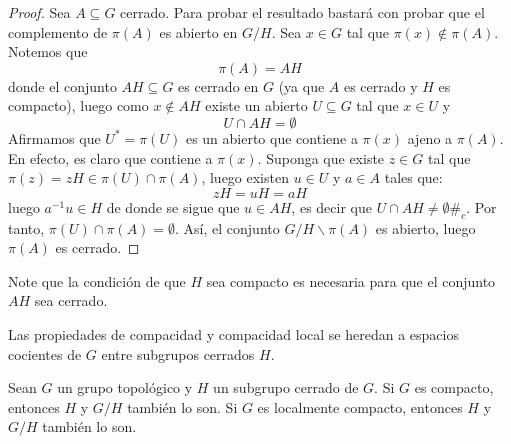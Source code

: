 \documentclass[12pt]{report}
\theoremstyle{largebreak}
\newcommand{\contradiction}{\ensuremath{\#_{c}}}
\begin{document}
    \begin{proof}
        Sea $A\subseteq G$ cerrado. Para probar el resultado bastará con probar que el complemento de $\pi(A)$ es abierto en $G/H$. Sea $x\in G$ tal que $\pi(x)\notin\pi(A)$. Notemos que
        \begin{equation*}
            \pi(A)=AH
        \end{equation*}
        donde el conjunto $AH\subseteq G$ es cerrado en $G$ (ya que $A$ es cerrado y $H$ es compacto), luego como $x\notin AH$ existe un abierto $U\subseteq G$ tal que $x\in U$ y
        \begin{equation*}
            U\cap AH=\emptyset
        \end{equation*}
        Afirmamos que $U^*=\pi(U)$ es un abierto que contiene a $\pi(x)$ ajeno a $\pi(A)$. En efecto, es claro que contiene a $\pi(x)$. Suponga que existe $z\in G$ tal que $\pi(z)=zH\in \pi(U)\cap\pi(A)$, luego existen $u\in U$ y $a\in A$ tales que:
        \begin{equation*}
            zH=uH=aH
        \end{equation*}
        luego $a^{-1}u\in H$ de donde se sigue que $u\in AH$, es decir que $U\cap AH\neq\emptyset$\contradiction. Por tanto, $\pi(U)\cap \pi(A)=\emptyset$. Así, el conjunto $G/H\backslash\pi(A)$ es abierto, luego $\pi(A)$ es cerrado.
    \end{proof}

    \begin{obs}
        Note que la condición de que $H$ sea compacto es necesaria para que el conjunto $AH$ sea cerrado.
    \end{obs}

    Las propiedades de compacidad y compacidad local se heredan a espacios cocientes de $G$ entre subgrupos cerrados $H$.

    \begin{theor}
        Sean $G$ un grupo topológico y $H$ un subgrupo cerrado de $G$. Si $G$ es compacto, entonces $H$ y $G/H$ también lo son. Si $G$ es localmente compacto, entonces $H$ y $G/H$ también lo son.
    \end{theor}
\end{document}
